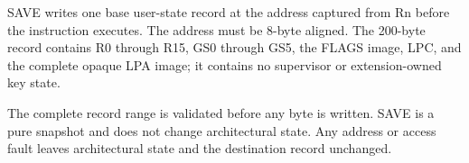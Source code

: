 SAVE writes one base user-state record at the address captured from Rn before the instruction executes. The address must be 8-byte aligned. The 200-byte record contains R0 through R15, GS0 through GS5, the FLAGS image, LPC, and the complete opaque LPA image; it contains no supervisor or extension-owned key state.

The complete record range is validated before any byte is written. SAVE is a pure snapshot and does not change architectural state. Any address or access fault leaves architectural state and the destination record unchanged.
